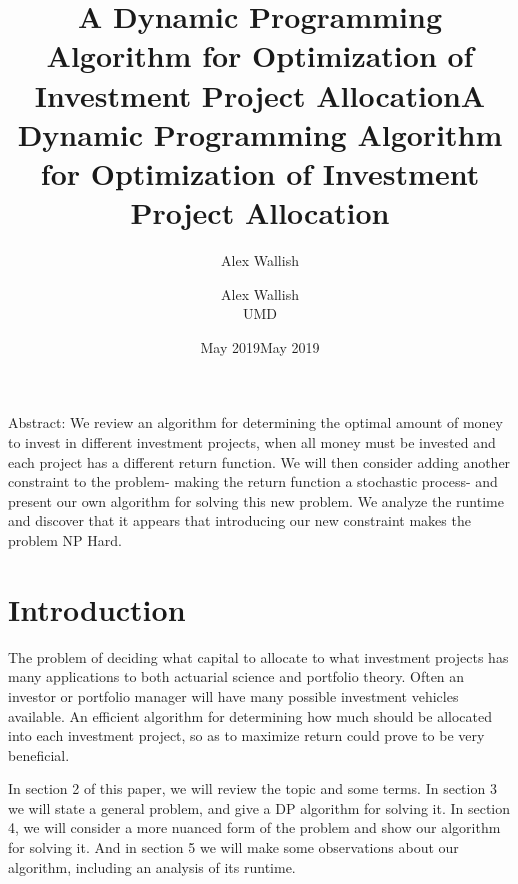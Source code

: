 \documentclass{article}
\title{A Dynamic Programming Algorithm for Optimization of Investment Project Allocation}
\author{Alex Wallish}
\date{May 2019}
\title{A Dynamic Programming Algorithm for Optimization of Investment Project Allocation}
\date{May 2019}
\author{Alex Wallish\\ UMD}
\begin{document}
\maketitle


\vspace*{100px}
Abstract: 
We review an algorithm for determining the optimal amount of money to invest in different investment projects, when all money must be invested and each project has a different return function.  We will then consider adding another constraint to the problem- making the return function a stochastic process- and present our own algorithm for solving this new problem.  We analyze the runtime and discover that it appears that introducing our new constraint makes the problem NP Hard.  
 



\pagebreak
\section{Introduction}
The problem of deciding what capital to allocate to what investment projects has many applications to both actuarial science and portfolio theory.  Often an investor or portfolio manager will have many possible investment vehicles available. An efficient algorithm for determining how much should be allocated into each investment project, so as to maximize return could prove to be very beneficial. 
\par
In section 2 of this paper, we will review the topic and some terms. In section 3 we will state a general problem, and give a DP algorithm for solving it.  In section 4, we will consider a more nuanced form of the problem and show our algorithm for solving it. And in section 5 we will make some observations about our algorithm, including an analysis of its runtime. 
\end{document}
